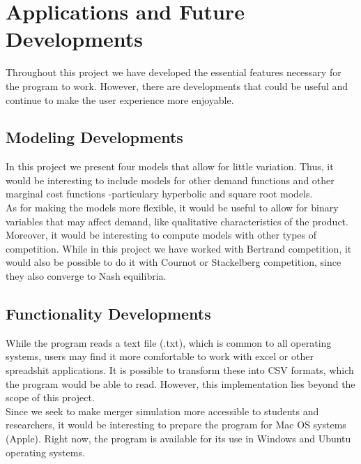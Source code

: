 \documentclass[12pt]{article}
\begin{document}
\section{Applications and Future Developments}
Throughout this project we have developed the essential features necessary for the program to work. However, there are developments that could be useful and continue to make the user experience more enjoyable.
\subsection{Modeling Developments}
In this project we present four models that allow for little variation. Thus, it would be interesting to include models for other demand functions and other marginal cost functions -particulary hyperbolic and square root models. \\
As for making the models more flexible, it would be useful to allow for binary variables that may affect demand, like qualitative characteristics of the product.\\ 
Moreover, it would be interesting to compute models with other types of competition. While in this project we have worked with Bertrand competition, it would also be possible to do it with Cournot or Stackelberg competition, since they also converge to Nash equilibria. 
\subsection{Functionality Developments}
While the program reads a text file (.txt), which is common to all operating systems, users may find it more comfortable to work with excel or other spreadshit applications. It is possible to transform these into CSV formats, which the program would be able to read. However, this implementation lies beyond the scope of this project.\\
Since we seek to make merger simulation more accessible to students and researchers, it would be interesting to prepare the program for Mac OS systems (Apple). Right now, the program is available for its use in Windows and Ubuntu operating systems. 
\end{document}
